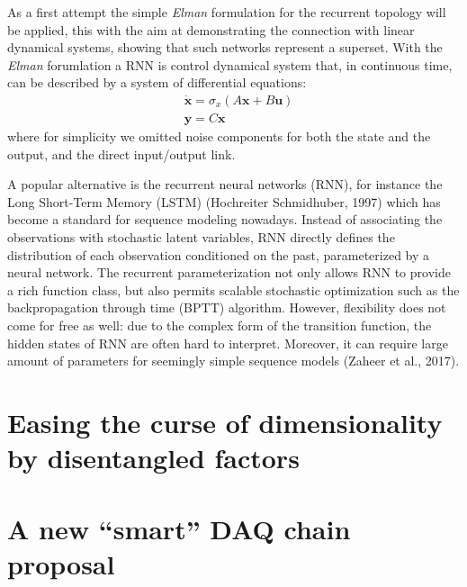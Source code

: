 As a first attempt the simple \textit{Elman} formulation for the recurrent topology will be applied, this with the aim at demonstrating the connection with linear dynamical systems, showing that such networks represent a superset.
With the \textit{Elman} forumlation a \acs{RNN} is control dynamical system that, in continuous time, can be described by a system of differential equations:
\begin{align}
    & \dot{\bm{x}} = \sigma_x \left( A\bm{x} + B\bm{u} \right) \\
    & \bm{y} = C\bm{x}
\end{align}
where for simplicity we omitted noise components for both the state and the output, and the direct input/output link.



A popular alternative is the recurrent neural networks (RNN), for instance the Long Short-Term
Memory (LSTM) (Hochreiter  Schmidhuber, 1997) which has become a standard for sequence
modeling nowadays. Instead of associating the observations with stochastic latent variables, RNN
directly defines the distribution of each observation conditioned on the past, parameterized by a
neural network. The recurrent parameterization not only allows RNN to provide a rich function
class, but also permits scalable stochastic optimization such as the backpropagation through time
(BPTT) algorithm. However, flexibility does not come for free as well: due to the complex form of
the transition function, the hidden states of RNN are often hard to interpret. Moreover, it can require
large amount of parameters for seemingly simple sequence models (Zaheer et al., 2017).



\section{Easing the curse of dimensionality by disentangled factors}


\section{A new “smart” DAQ chain proposal}

